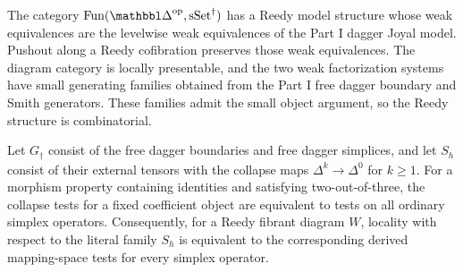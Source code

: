 \begin{resultblock}
\begin{proposition}
\label{catalogue:A2}
The category $\Fun(\prism^{\mathrm{op}},\sSet^{\dag})$ has a Reedy model structure whose weak equivalences are the levelwise weak equivalences of the Part I dagger Joyal model.
Pushout along a Reedy cofibration preserves those weak equivalences.
The diagram category is locally presentable, and the two weak factorization systems have small generating families obtained from the Part I free dagger boundary and Smith generators.
These families admit the small object argument, so the Reedy structure is combinatorial.
\end{proposition}

\end{resultblock}

\begin{resultblock}
\begin{proposition}
\label{catalogue:A3}
Let $G_{\dag}$ consist of the free dagger boundaries and free dagger simplices, and let $S_h$ consist of their external tensors with the collapse maps $\Delta^k\to\Delta^0$ for $k\geq1$.
For a morphism property containing identities and satisfying two-out-of-three, the collapse tests for a fixed coefficient object are equivalent to tests on all ordinary simplex operators.
Consequently, for a Reedy fibrant diagram $W$, locality with respect to the literal family $S_h$ is equivalent to the corresponding derived mapping-space tests for every simplex operator.
\end{proposition}

\end{resultblock}

